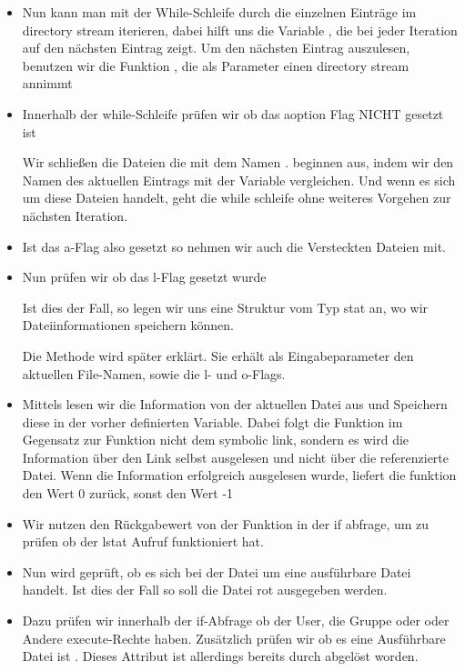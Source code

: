 \begin{itemize}
\item Nun kann man mit der While-Schleife durch die einzelnen Einträge im
directory stream iterieren,
dabei hilft uns die Variable , die bei jeder Iteration auf
den nächsten Eintrag zeigt.
Um den nächsten Eintrag auszulesen, benutzen wir die Funktion ,
die als Parameter einen directory stream annimmt


\item Innerhalb der while-Schleife prüfen wir ob das aoption Flag NICHT gesetzt ist

Wir schließen die Dateien die mit dem Namen \textit{.} beginnen aus,
indem wir den Namen des aktuellen Eintrags mit der Variable  vergleichen.
Und wenn es sich um diese Dateien handelt, geht die while schleife
ohne weiteres Vorgehen zur nächsten Iteration.


\item Ist das a-Flag also gesetzt so nehmen wir auch die Versteckten Dateien
mit.

\item Nun prüfen wir ob das l-Flag gesetzt wurde 

Ist dies der Fall, so legen wir uns eine Struktur vom Typ stat an, wo
wir Dateiinformationen speichern können.

Die Methode  wird
später erklärt. Sie erhält als Eingabeparameter den aktuellen File-Namen, sowie
die l- und o-Flags.

\item Mittels  lesen wir die Information von der aktuellen Datei aus
und Speichern diese in der vorher definierten  Variable.
Dabei folgt die Funktion im Gegensatz zur Funktion  nicht dem symbolic link,
sondern es wird die Information über den Link selbst ausgelesen und nicht über die referenzierte Datei.
Wenn die Information erfolgreich ausgelesen wurde, liefert die funktion den Wert 0 zurück,
sonst den Wert -1
\item Wir nutzen den Rückgabewert von der Funktion   in der if abfrage,
um zu prüfen ob der lstat Aufruf funktioniert hat.
\item Nun wird geprüft, ob es sich bei der Datei um eine ausführbare Datei handelt.
Ist dies der Fall so soll die Datei rot ausgegeben werden.
\item Dazu prüfen wir innerhalb der if-Abfrage ob der User, die Gruppe oder
oder Andere execute-Rechte haben. Zusätzlich prüfen wir ob es eine
Ausführbare Datei ist . Dieses Attribut ist allerdings
bereits durch  abgelöst worden.


\end{itemize}
